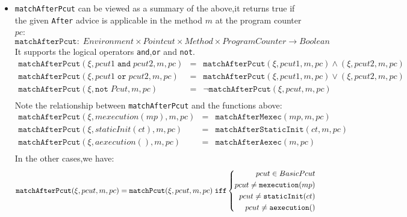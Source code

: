 \begin{itemize}
  \item \texttt{matchAfterPcut} can be viewed as a summary of the above,it returns true if the given \texttt{After} advice is applicable in the method $m$ at the program counter $pc$:
$$\texttt{matchAfterPcut}:\; Environment\times Pointcut\times Method\times ProgramCounter\rightarrow Boolean$$
It supports the logical operators \texttt{and},\texttt{or} and \texttt{not}.
\begin{eqnarray*}
  \texttt{matchAfterPcut}(\xi,pcut1\;\texttt{and}\;pcut2,m,pc)&=&\texttt{matchAfterPcut}(\xi,pcut1,m,pc)\wedge(\xi,pcut2,m,pc)\\
  \texttt{matchAfterPcut}(\xi,pcut1\;\texttt{or}\;pcut2,m,pc)&=&\texttt{matchAfterPcut}(\xi,pcut1,m,pc)\vee(\xi,pcut2,m,pc)\\
  \texttt{matchAfterPcut}(\xi,\texttt{not}\;Pcut,m,pc)&=&\neg \texttt{matchAfterPcut}(\xi,pcut,m,pc)\\
\end{eqnarray*}
Note the relationship between \texttt{matchAfterPcut} and the functions above:
\begin{eqnarray*}
  \texttt{matchAfterPcut}(\xi,mexecution(mp),m,pc)&=&\texttt{matchAfterMexec}(mp,m,pc)\\
  \texttt{matchAfterPcut}(\xi,staticInit(ct),m,pc)&=&\texttt{matchAfterStaticInit}(ct,m,pc)\\
  \texttt{matchAfterPcut}(\xi,aexecution(),m,pc)&=&\texttt{matchAfterAexec}(m,pc)\\
\end{eqnarray*}
In the other cases,we have:
  $$\texttt{matchAfterPcut}(\xi,pcut,m,pc)=\texttt{matchPcut}(\xi,pcut,m,pc)\;\texttt{iff}\left\{
  \begin{aligned}
    pcut\in BasicPcut\\
    pcut\neq \texttt{mexecution}(mp)\\
    pcut\neq \texttt{staticInit}(ct)\\
    pcut\neq \texttt{aexecution}()\\
  \end{aligned}\right.\\$$
\end{itemize}


